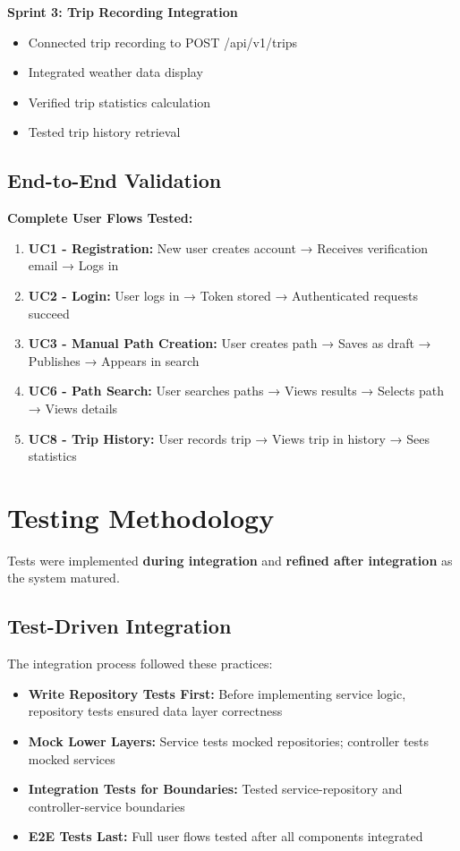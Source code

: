 \textbf{Sprint 3: Trip Recording Integration}
\begin{itemize}
    \item Connected trip recording to POST /api/v1/trips
    \item Integrated weather data display
    \item Verified trip statistics calculation
    \item Tested trip history retrieval
\end{itemize}

\subsection{End-to-End Validation}
\label{subsec:e2e_validation}

\textbf{Complete User Flows Tested:}
\begin{enumerate}
    \item \textbf{UC1 - Registration:} New user creates account → Receives verification email → Logs in
    \item \textbf{UC2 - Login:} User logs in → Token stored → Authenticated requests succeed
    \item \textbf{UC3 - Manual Path Creation:} User creates path → Saves as draft → Publishes → Appears in search
    \item \textbf{UC6 - Path Search:} User searches paths → Views results → Selects path → Views details
    \item \textbf{UC8 - Trip History:} User records trip → Views trip in history → Sees statistics
\end{enumerate}

\section{Testing Methodology}
\label{sec:testing_methodology}

Tests were implemented \textbf{during integration} and \textbf{refined after integration} as the system matured.

\subsection{Test-Driven Integration}
\label{subsec:test_driven_integration}

The integration process followed these practices:

\begin{itemize}
    \item \textbf{Write Repository Tests First:} Before implementing service logic, repository tests ensured data layer correctness
    \item \textbf{Mock Lower Layers:} Service tests mocked repositories; controller tests mocked services
    \item \textbf{Integration Tests for Boundaries:} Tested service-repository and controller-service boundaries
    \item \textbf{E2E Tests Last:} Full user flows tested after all components integrated
\end{itemize}

